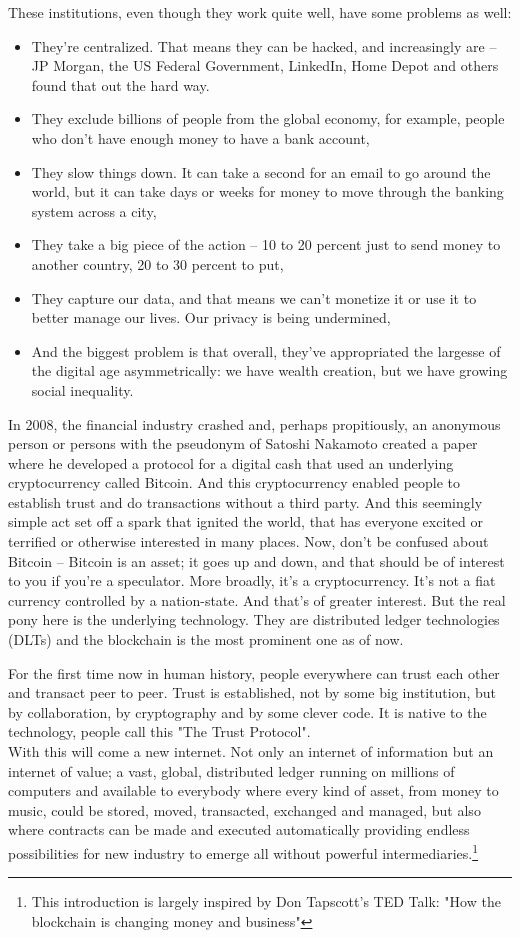 \documentclass[a4paper]{article}
\begin{document}
These institutions, even though they work quite well, have some problems as well:
\begin{itemize}
\item They're centralized. That means they can be hacked, and increasingly are -- JP Morgan, the US Federal Government, LinkedIn, Home Depot and others found that out the hard way.
\item They exclude billions of people from the global economy, for example, people who don't have enough money to have a bank account,
\item They slow things down. It can take a second for an email to go around the world, but it can take days or weeks for money to move through the banking system across a city,
\item They take a big piece of the action -- 10 to 20 percent just to send money to another country, 20 to 30 percent to put,
\item They capture our data, and that means we can't monetize it or use it to better manage our lives. Our privacy is being undermined,
\item And the biggest problem is that overall, they've appropriated the largesse of the digital age asymmetrically: we have wealth creation, but we have growing social inequality.
\end{itemize}

In 2008, the financial industry crashed and, perhaps propitiously, an anonymous person or persons with the pseudonym of Satoshi Nakamoto created a paper where he developed a protocol for a digital cash that used an underlying cryptocurrency called Bitcoin. And this cryptocurrency enabled people to establish trust and do transactions without a third party. And this seemingly simple act set off a spark that ignited the world, that has everyone excited or terrified or otherwise interested in many places. Now, don't be confused about Bitcoin -- Bitcoin is an asset; it goes up and down, and that should be of interest to you if you're a speculator. More broadly, it's a cryptocurrency. It's not a fiat currency controlled by a nation-state. And that's of greater interest. But the real pony here is the underlying technology. They are distributed ledger technologies (DLTs) and the blockchain is the most prominent one as of now.

For the first time now in human history, people everywhere can trust each other and transact peer to peer. Trust is established, not by some big institution, but by collaboration, by cryptography and by some clever code. It is native to the technology, people call this "The Trust Protocol".\\
With this will come a new internet. Not only an internet of information but an internet of value; a vast, global, distributed ledger running on millions of computers and available to everybody where every kind of asset, from money to music, could be stored, moved, transacted, exchanged and managed, but also where contracts can be made and executed automatically providing endless possibilities for new industry to emerge all without powerful intermediaries.\footnote{This introduction is largely inspired by Don Tapscott's TED Talk: "How the blockchain is changing money and business"}
\end{document}
